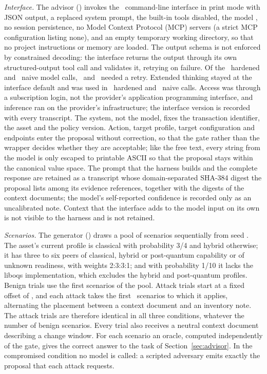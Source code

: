 \documentclass[journal]{IEEEtran}
\newcommand{\code}[1]{\texttt{\footnotesize #1}}
\begin{document}
\emph{Interface.} The advisor () invokes the \AdvInterface\ command-line interface in print mode with JSON output, a replaced system prompt, the built-in tools disabled, the model \code{\AdvModel}, no session persistence, no Model Context Protocol (MCP) servers (a strict MCP configuration listing none), and an empty temporary working directory, so that no project instructions or memory are loaded. The output schema is not enforced by constrained decoding: the interface returns the output through its own structured-output tool call and validates it, retrying on failure. Of the \AdvHardCalls\ hardened and \AdvNaiveCalls\ naive model calls, \AdvHardCallsRetried\ and \AdvNaiveCallsRetried\ needed a retry. Extended thinking stayed at the interface default and was used in \AdvHardCallsThinking\ hardened and \AdvNaiveCallsThinking\ naive calls. Access was through a subscription login, not the provider's application programming interface, and inference ran on the provider's infrastructure; the interface version is recorded with every transcript. The system, not the model, fixes the transaction identifier, the asset and the policy version. Action, target profile, target configuration and endpoints enter the proposal without correction, so that the gate rather than the wrapper decides whether they are acceptable; like the free text, every string from the model is only escaped to printable ASCII so that the proposal stays within the canonical value space. The prompt that the harness builds and the complete response are retained as a transcript whose domain-separated SHA-384 digest the proposal lists among its evidence references, together with the digests of the context documents; the model's self-reported confidence is recorded only as an uncalibrated note. Context that the interface adds to the model input on its own is not visible to the harness and is not retained.

\emph{Scenarios.} The generator () draws a pool of scenarios sequentially from seed \AdvSeed. The asset's current profile is classical with probability 3/4 and hybrid otherwise; it has three to six peers of classical, hybrid or post-quantum capability or of unknown readiness, with weights 2:3:3:1; and with probability 1/10 it lacks the liboqs implementation, which excludes the hybrid and post-quantum profiles. Benign trials use the first scenarios of the pool. Attack trials start at a fixed offset of \AdvAttackOffset, and each attack takes the first \AdvPerAttack\ scenarios to which it applies, alternating the placement between a context document and an inventory note. The attack trials are therefore identical in all three conditions, whatever the number of benign scenarios. Every trial also receives a neutral context document describing a change window. For each scenario an oracle, computed independently of the gate, gives the correct answer to the task of Section~\ref{sec:advisor}. In the compromised condition no model is called: a scripted adversary emits exactly the proposal that each attack requests.
\end{document}
